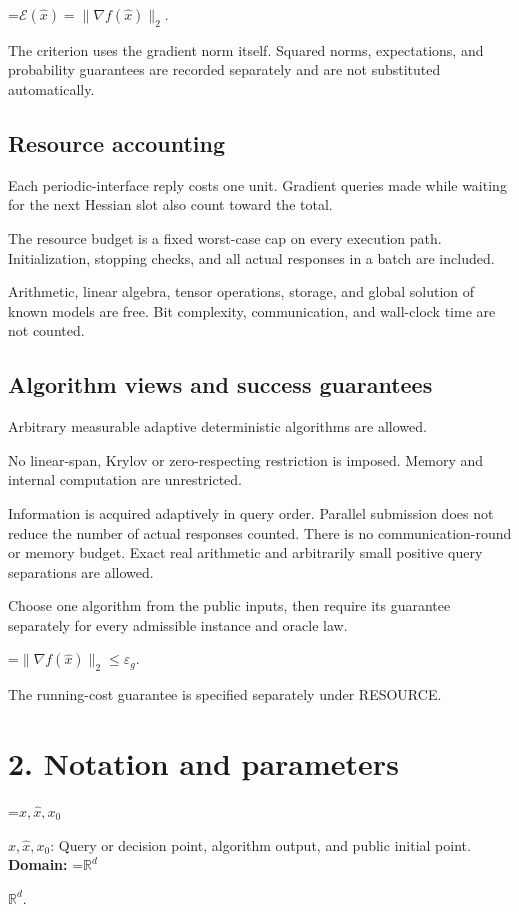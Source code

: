 \documentclass[10pt,a4paper]{article}
\newcommand{\AtlasMath}[1]{\par\begingroup\centering\setbox0=\hbox{$\displaystyle #1$}\ifdim\wd0>1.4\linewidth\typeout{ATLAS WIDE FORMULA: \the\wd0}\fi\ifdim\wd0>\linewidth\resizebox{\linewidth}{!}{\box0}\else\box0\fi\par\endgroup}
\newcommand{\AtlasInlineMath}[1]{\begingroup\setbox0=\hbox{$#1$}\ifdim\wd0>.4\linewidth\endgroup\AtlasMath{#1}\else\endgroup$#1$\fi}
\begin{document}
\AtlasMath{\mathcal{E}(\widehat{x})=\|\nabla f(\widehat{x})\|_2.}


The criterion uses the gradient norm itself. Squared norms, expectations, and probability guarantees are recorded separately and are not substituted automatically.

\subsection{Resource accounting}
Each periodic-interface reply costs one unit. Gradient queries made while waiting for the next Hessian slot also count toward the total.

The resource budget is a fixed worst-case cap on every execution path. Initialization, stopping checks, and all actual responses in a batch are included.

Arithmetic, linear algebra, tensor operations, storage, and global solution of known models are free. Bit complexity, communication, and wall-clock time are not counted.

\subsection{Algorithm views and success guarantees}
Arbitrary measurable adaptive deterministic algorithms are allowed.

No linear-span, Krylov or zero-respecting restriction is imposed. Memory and internal computation are unrestricted.

Information is acquired adaptively in query order. Parallel submission does not reduce the number of actual responses counted. There is no communication-round or memory budget. Exact real arithmetic and arbitrarily small positive query separations are allowed.

Choose one algorithm from the public inputs, then require its guarantee separately for every admissible instance and oracle law.


\AtlasMath{\|\nabla f(\widehat{x})\|_2\le \varepsilon_g.}


The running-cost guarantee is specified separately under RESOURCE.

\section{2. Notation and parameters}
\AtlasInlineMath{x,\widehat{x},x_0}: Query or decision point, algorithm output, and public initial point. \textbf{Domain:} \AtlasInlineMath{\mathbb{R}^d}.
\end{document}
